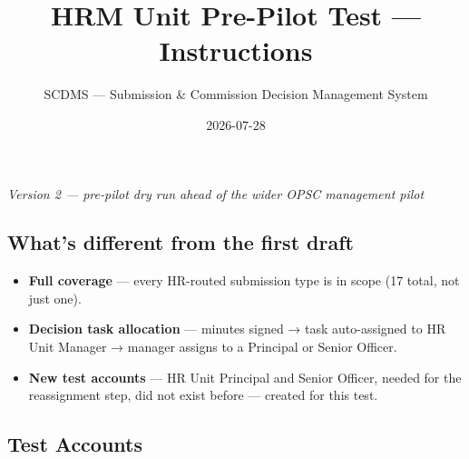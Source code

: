 \documentclass[
  11pt,
  letterpaper,
  DIV=11,
  numbers=noendperiod]{scrartcl}
\title{HRM Unit Pre-Pilot Test --- Instructions}
\subtitle{SCDMS --- Submission \& Commission Decision Management System}
\author{}
\date{2026-07-28}
\providecommand{\tightlist}{%
  \setlength{\itemsep}{0pt}\setlength{\parskip}{0pt}}
\begin{document}
\maketitle


\emph{Version 2 --- pre-pilot dry run ahead of the wider OPSC management
pilot}

\subsection{What's different from the first
draft}\label{whats-different-from-the-first-draft}

\begin{itemize}
\tightlist
\item
  \textbf{Full coverage} --- every HR-routed submission type is in scope
  (17 total, not just one).
\item
  \textbf{Decision task allocation} --- minutes signed → task
  auto-assigned to HR Unit Manager → manager assigns to a Principal or
  Senior Officer.
\item
  \textbf{New test accounts} --- HR Unit Principal and Senior Officer,
  needed for the reassignment step, did not exist before --- created for
  this test.
\end{itemize}

\subsection{Test Accounts}\label{test-accounts}
\end{document}
